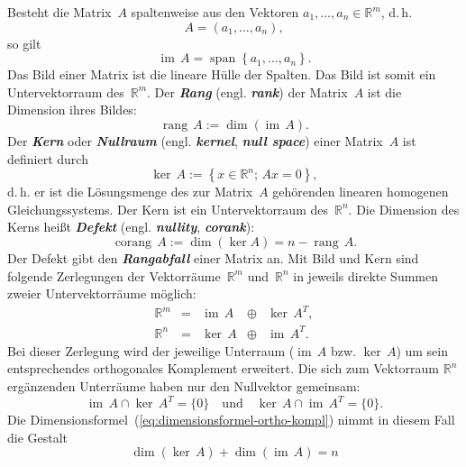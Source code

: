  Besteht die Matrix~$A$ spaltenweise aus den Vektoren $a_{1},\ldots,a_{n}\in{\mathbb{R}}^{m}$,
d.\,h.
\[
A=\left(a_{1},\ldots,a_{n}\right),
\]
so gilt
\[
{\operatorname{im}}\,A={\operatorname{span}}\left\{ a_{1},\ldots,a_{n}\right\} .
\]
Das Bild einer Matrix ist die lineare Hülle der Spalten.
Das Bild
ist somit ein Untervektorraum des~${\mathbb{R}}^{m}$.
Der \textbf{\em Rang} (engl.
\textbf{\em rank}) der Matrix~$A$ ist die Dimension ihres Bildes:
\begin{equation}
{\operatorname{rang}}\,A:=\dim({\operatorname{im}}\,A).\label{eq:rank}
\end{equation}
Der \textbf{\em Kern} oder \textbf{\em Nullraum}
(engl. \textbf{\em kernel}, \textbf{\em null space}) einer Matrix~$A$ ist definiert
durch
\[
\ker\,A:=\left\{ x\in{\mathbb{R}}^{n};\,Ax=0\right\} ,
\]
d.\,h. er ist die Lösungsmenge des zur Matrix~$A$ gehörenden linearen
homogenen Gleichungssystems.
Der Kern ist ein Untervektorraum des~${\mathbb{R}}^{n}$.
Die Dimension des Kerns heißt \textbf{\em Defekt} (engl. \textbf{\em nullity},
\textbf{\em corank}):
\begin{equation}
{\operatorname{corang}}\,A:=\dim(\ker A)=n-{\operatorname{rang}}\,A.\label{eq:corank}
\end{equation}
Der Defekt gibt den \textbf{\em Rangabfall} einer Matrix an.
Mit Bild und Kern sind folgende Zerlegungen der Vektorräume~${\mathbb{R}}^{m}$
und~${\mathbb{R}}^{n}$ in jeweils direkte Summen zweier Untervektorräume möglich:
\begin{equation}
\begin{array}{lcccc}
{\mathbb{R}}^{m} & = & {\operatorname{im}}\,A & \oplus & \ker\,A^{T},\\
{\mathbb{R}}^{n} & = & \ker\,A & \oplus & {\operatorname{im}}\,A^{T}.
\end{array}\label{eq:zerleg-im-ker}
\end{equation}
Bei dieser Zerlegung wird der jeweilige Unterraum (${\operatorname{im}}\,A$ bzw.
$\ker\,A$) um sein entsprechendes orthogonales Komplement erweitert.
Die sich zum Vektorraum ${\mathbb{R}}^{n}$ ergänzenden Unterräume haben nur
den Nullvektor gemeinsam:
\[
{\operatorname{im}}\,A\cap\ker\,A^{T}=\{0\}\quad\text{und}\quad\ker\,A\cap{\operatorname{im}}\,A^{T}=\{0\}.
\]
Die Dimensionsformel~(\ref{eq:dimensionsformel-ortho-kompl})
nimmt in diesem Fall die Gestalt
\begin{equation}
\dim(\ker\,A)+\dim({\operatorname{im}}\,A)=n\label{eq:dimensions-formel}
\end{equation}
